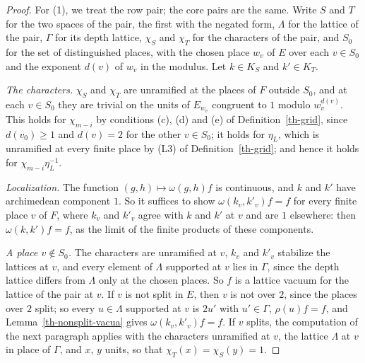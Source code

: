 \begin{proof}
For (1), we treat the row pair; the core pairs are the same. Write $S$ and $T$
for the two spaces of the pair, the first with the negated form, $\Lambda$ for
the lattice of the pair, $\Gamma$ for its depth lattice, $\chi_S$ and $\chi_T$
for the characters of the pair, and $S_0$ for the set of distinguished places,
with the chosen place $w_v$ of $E$ over each $v\in S_0$ and the exponent
$d(v)$ of $w_v$ in the modulus. Let $k\in K_S$ and $k'\in K_T$.

\emph{The characters.} $\chi_S$ and $\chi_T$ are unramified at the places of
$F$ outside $S_0$, and at each $v\in S_0$ they are trivial on the units of
$E_{w_v}$ congruent to $1$ modulo $w_v^{d(v)}$. This holds for $\chi_{m-i}$ by
conditions (c), (d) and (e) of Definition~\ref{th-grid}, since $d(v_0)\geq1$
and $d(v)=2$ for the other $v\in S_0$; it holds for $\eta_L$, which is
unramified at every finite place by (L3) of Definition~\ref{th-grid}; and hence
it holds for $\chi_{m-i}\eta_L^{-1}$.

\emph{Localization.} The function $(g,h)\mapsto\omega(g,h)f$ is continuous, and
$k$ and $k'$ have archimedean component $1$. So it suffices to show
$\omega(k_v,k'_v)f=f$ for every finite place $v$ of $F$, where $k_v$ and $k'_v$
agree with $k$ and $k'$ at $v$ and are $1$ elsewhere: then
$\omega(k,k')f=f$, as the limit of the finite products of these components.

\emph{A place $v\notin S_0$.} The characters are unramified at $v$, $k_v$ and
$k'_v$ stabilize the lattices at $v$, and every element of $\Lambda$ supported
at $v$ lies in $\Gamma$, since the depth lattice differs from $\Lambda$ only at
the chosen places. So $f$ is a lattice vacuum for the lattice of the pair at
$v$. If $v$ is not split in $E$, then $v$ is not over $2$, since the places over
$2$ split; so every $u\in\Lambda$ supported at $v$ is $2u'$ with $u'\in\Gamma$,
$\rho(u)f=f$, and Lemma~\ref{th-nonsplit-vacua} gives $\omega(k_v,k'_v)f=f$. If
$v$ splits, the computation of the next paragraph applies with the characters
unramified at $v$, the lattice $\Lambda$ at $v$ in place of $\Gamma$, and
$x$, $y$ units, so that $\chi_T(x)=\chi_S(y)=1$.


\end{proof}
